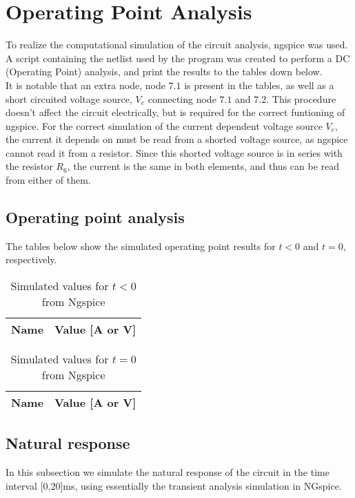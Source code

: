 \section{Operating Point Analysis}
\label{sec:simulation}

To realize the computational simulation of the circuit analysis, ngspice was used. A script containing the netlist used by the program was created to perform a DC (Operating Point) analysis, and print the results to the tables down below.\\ 
It is notable that an extra node, node $7.1$ is present in the tables, as well as a short circuited voltage source, $V_{e}$ connecting node $7.1$ and $7.2$. This procedure doesn't affect the circuit electrically, but is required for the correct funtioning of ngspice. For the correct simulation of the current dependent voltage source $V_{c}$, the current it depends on must be read from a shorted voltage source, as ngspice cannot read it from a resistor. Since this shorted voltage source is in series with the resistor $R_{6}$, the current is the same in both elements, and thus can be read from either of them.\\ 

\subsection{Operating point analysis} 

The tables below show the simulated operating point results for $t<0$ and $t=0$, respectively. 
\FloatBarrier
\begin{table}[h]
  \centering
  \begin{tabular}{|l|r|}
    \hline    
    {\bf Name} & {\bf Value [A or V]} \\ \hline
    
  \end{tabular}
  \caption{Simulated values for $t<0$ from Ngspice}
  \label{tab:op}
\end{table}
\FloatBarrier

\FloatBarrier
\begin{table}[h]
  \centering
  \begin{tabular}{|l|r|}
    \hline    
    {\bf Name} & {\bf Value [A or V]} \\ \hline
    
  \end{tabular}
  \caption{Simulated values for $t=0$ from Ngspice}
  \label{tab:op}
\end{table}
\FloatBarrier


\subsection{Natural response}
In this subsection we simulate the natural response of the circuit in the time interval [0,20]ms, using essentially the transient analysis simulation in NGspice. 

